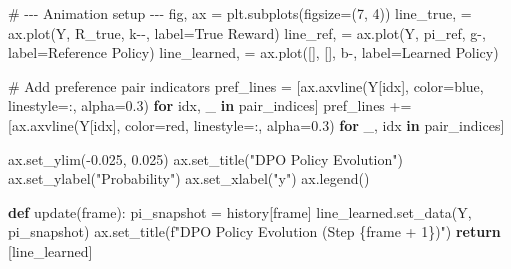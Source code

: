 \documentclass[
  letterpaper,
  numbers=noenddot,
  DIV=11]{scrreprt}
\newenvironment{Shaded}{\begin{snugshade}}{\end{snugshade}}
\newcommand{\CommentTok}[1]{\textcolor[rgb]{0.37,0.37,0.37}{#1}}
\newcommand{\ControlFlowTok}[1]{\textcolor[rgb]{0.00,0.23,0.31}{\textbf{#1}}}
\newcommand{\DecValTok}[1]{\textcolor[rgb]{0.68,0.00,0.00}{#1}}
\newcommand{\FloatTok}[1]{\textcolor[rgb]{0.68,0.00,0.00}{#1}}
\newcommand{\KeywordTok}[1]{\textcolor[rgb]{0.00,0.23,0.31}{\textbf{#1}}}
\newcommand{\NormalTok}[1]{\textcolor[rgb]{0.00,0.23,0.31}{#1}}
\newcommand{\OperatorTok}[1]{\textcolor[rgb]{0.37,0.37,0.37}{#1}}
\newcommand{\SpecialCharTok}[1]{\textcolor[rgb]{0.37,0.37,0.37}{#1}}
\newcommand{\SpecialStringTok}[1]{\textcolor[rgb]{0.13,0.47,0.30}{#1}}
\newcommand{\StringTok}[1]{\textcolor[rgb]{0.13,0.47,0.30}{#1}}
\theoremstyle{plain}
\theoremstyle{definition}
\theoremstyle{remark}
\begin{document}
\begin{Shaded}
\begin{Highlighting}[numbers=left,,]
\CommentTok{\# {-}{-}{-} Animation setup {-}{-}{-}}
\NormalTok{fig, ax }\OperatorTok{=}\NormalTok{ plt.subplots(figsize}\OperatorTok{=}\NormalTok{(}\DecValTok{7}\NormalTok{, }\DecValTok{4}\NormalTok{))}
\NormalTok{line\_true, }\OperatorTok{=}\NormalTok{ ax.plot(Y, R\_true, }\StringTok{\textquotesingle{}k{-}{-}\textquotesingle{}}\NormalTok{, label}\OperatorTok{=}\StringTok{\textquotesingle{}True Reward\textquotesingle{}}\NormalTok{)}
\NormalTok{line\_ref, }\OperatorTok{=}\NormalTok{ ax.plot(Y, pi\_ref, }\StringTok{\textquotesingle{}g{-}\textquotesingle{}}\NormalTok{, label}\OperatorTok{=}\StringTok{\textquotesingle{}Reference Policy\textquotesingle{}}\NormalTok{)}
\NormalTok{line\_learned, }\OperatorTok{=}\NormalTok{ ax.plot([], [], }\StringTok{\textquotesingle{}b{-}\textquotesingle{}}\NormalTok{, label}\OperatorTok{=}\StringTok{\textquotesingle{}Learned Policy\textquotesingle{}}\NormalTok{)}

\CommentTok{\# Add preference pair indicators}
\NormalTok{pref\_lines }\OperatorTok{=}\NormalTok{ [ax.axvline(Y[idx], color}\OperatorTok{=}\StringTok{\textquotesingle{}blue\textquotesingle{}}\NormalTok{, linestyle}\OperatorTok{=}\StringTok{\textquotesingle{}:\textquotesingle{}}\NormalTok{, alpha}\OperatorTok{=}\FloatTok{0.3}\NormalTok{) }\ControlFlowTok{for}\NormalTok{ idx, \_ }\KeywordTok{in}\NormalTok{ pair\_indices]}
\NormalTok{pref\_lines }\OperatorTok{+=}\NormalTok{ [ax.axvline(Y[idx], color}\OperatorTok{=}\StringTok{\textquotesingle{}red\textquotesingle{}}\NormalTok{, linestyle}\OperatorTok{=}\StringTok{\textquotesingle{}:\textquotesingle{}}\NormalTok{, alpha}\OperatorTok{=}\FloatTok{0.3}\NormalTok{) }\ControlFlowTok{for}\NormalTok{ \_, idx }\KeywordTok{in}\NormalTok{ pair\_indices]}

\NormalTok{ax.set\_ylim(}\OperatorTok{{-}}\FloatTok{0.025}\NormalTok{, }\FloatTok{0.025}\NormalTok{)}
\NormalTok{ax.set\_title(}\StringTok{"DPO Policy Evolution"}\NormalTok{)}
\NormalTok{ax.set\_ylabel(}\StringTok{"Probability"}\NormalTok{)}
\NormalTok{ax.set\_xlabel(}\StringTok{"y"}\NormalTok{)}
\NormalTok{ax.legend()}

\KeywordTok{def}\NormalTok{ update(frame):}
\NormalTok{    pi\_snapshot }\OperatorTok{=}\NormalTok{ history[frame]}
\NormalTok{    line\_learned.set\_data(Y, pi\_snapshot)}
\NormalTok{    ax.set\_title(}\SpecialStringTok{f"DPO Policy Evolution (Step }\SpecialCharTok{\{}\NormalTok{frame }\OperatorTok{+} \DecValTok{1}\SpecialCharTok{\}}\SpecialStringTok{)"}\NormalTok{)}
    \ControlFlowTok{return}\NormalTok{ [line\_learned]}


\end{Highlighting}
\end{Shaded}
\end{document}
